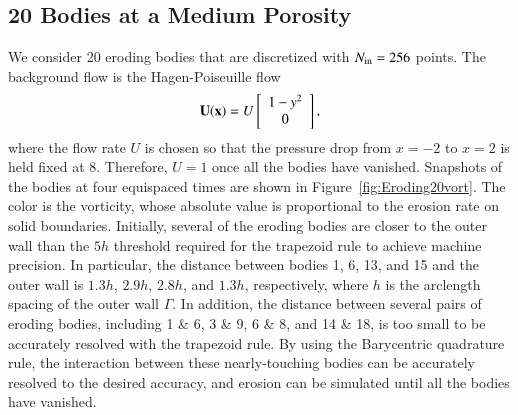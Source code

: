 \documentclass[preprint,10pt]{elsarticle}
\begin{document}
\subsection{20 Bodies at a Medium Porosity}
\label{sec:Eroding20}
We consider 20 eroding bodies that are discretized with $N_{\mathrm{in}}=256$
points.  The background flow is the Hagen-Poiseuille flow
\begin{align}
  {\mathbf{U}}({\mathbf{x}})=U \left[
  \begin{array}{c}
    1-y^2 \\ 0
  \end{array}
  \right],
\end{align}
where the flow rate $U$ is chosen so that the pressure drop from $x=-2$
to $x=2$ is held fixed at 8. Therefore, $U=1$ once all the bodies have
vanished.  Snapshots of the bodies at four equispaced times are shown in
Figure~\ref{fig:Eroding20vort}.  The color is the vorticity, whose
absolute value is proportional to the erosion rate on solid boundaries.
Initially, several of the eroding bodies are closer to the outer wall
than the $5h$ threshold required for the trapezoid rule to achieve
machine precision.  In particular, the distance between bodies 1, 6, 13,
and 15 and the outer wall is $1.3h$, $2.9h$, $2.8h$, and $1.3h$,
respectively, where $h$ is the arclength spacing of the outer wall
$\Gamma$.  In addition, the distance between several pairs of eroding
bodies, including 1 \& 6, 3 \& 9, 6 \& 8, and 14 \& 18, is too small to
be accurately resolved with the trapezoid rule.  By using the
Barycentric quadrature rule, the interaction between these
nearly-touching bodies can be accurately resolved to the desired
accuracy, and erosion can be simulated until all the bodies have
vanished.
\end{document}
